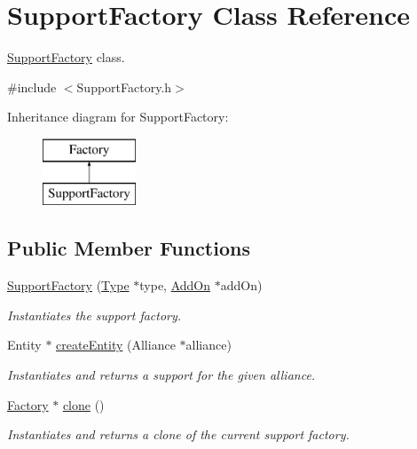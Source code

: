 \hypertarget{classSupportFactory}{}\section{Support\+Factory Class Reference}
\label{classSupportFactory}


\hyperlink{classSupportFactory}{Support\+Factory} class.  




{\ttfamily \#include $<$Support\+Factory.\+h$>$}

Inheritance diagram for Support\+Factory\+:\begin{figure}[H]
\begin{center}
\leavevmode
\includegraphics[height=2.000000cm]{classSupportFactory}
\end{center}
\end{figure}
\subsection*{Public Member Functions}
\begin{DoxyCompactItemize}
\item 
\hyperlink{classSupportFactory_a8e0b10fb625f7d4a93cec9989bef45c4}{Support\+Factory} (\hyperlink{classType}{Type} $\ast$type, \hyperlink{classAddOn}{Add\+On} $\ast$add\+On)
\begin{DoxyCompactList}\small\item\em Instantiates the support factory. \end{DoxyCompactList}\item 
Entity $\ast$ \hyperlink{classSupportFactory_ad2ebc8fdf1335e423a766fa0c5573cf8}{create\+Entity} (Alliance $\ast$alliance)
\begin{DoxyCompactList}\small\item\em Instantiates and returns a support for the given alliance. \end{DoxyCompactList}\item 
\hyperlink{classFactory}{Factory} $\ast$ \hyperlink{classSupportFactory_a802c25e901b479656ea95a5678a1ad26}{clone} ()
\begin{DoxyCompactList}\small\item\em Instantiates and returns a clone of the current support factory. \end{DoxyCompactList}\end{DoxyCompactItemize}


